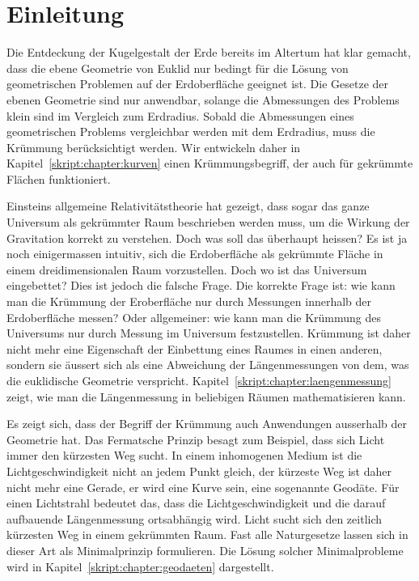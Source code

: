 %
%
%
\chapter*{Einleitung\label{chapter:einleitung}}
\rhead{}
Die Entdeckung der Kugelgestalt der Erde bereits im Altertum hat
klar gemacht, dass die ebene Geometrie von Euklid nur bedingt für
die Lösung von geometrischen Problemen auf der Erdoberfläche geeignet
ist.
Die Gesetze der ebenen Geometrie sind nur anwendbar, solange 
die Abmessungen des Problems klein sind im Vergleich zum Erdradius.
Sobald die Abmessungen eines geometrischen Problems vergleichbar werden
mit dem Erdradius, muss die Krümmung berücksichtigt werden.
Wir entwickeln daher in Kapitel~\ref{skript:chapter:kurven}
einen Krümmungsbegriff, der auch für gekrümmte Flächen funktioniert.

Einsteins allgemeine Relativitätstheorie hat gezeigt, dass sogar das
ganze Universum als gekrümmter Raum beschrieben werden muss, um die 
Wirkung der Gravitation korrekt zu verstehen.
Doch was soll das überhaupt heissen?
Es ist ja noch einigermassen intuitiv, sich die Erdoberfläche
als gekrümmte Fläche in einem dreidimensionalen Raum vorzustellen.
Doch wo ist das Universum eingebettet?
Dies ist jedoch die falsche Frage.
Die korrekte Frage ist: wie kann man die Krümmung der Eroberfläche
nur durch Messungen innerhalb der Erdoberfläche messen?
Oder allgemeiner: wie kann man die Krümmung des Universums nur durch
Messung im Universum festzustellen.
Krümmung ist daher nicht mehr eine Eigenschaft der Einbettung eines
Raumes in einen anderen, sondern sie äussert sich als eine Abweichung
der Längenmessungen von dem, was die euklidische Geometrie verspricht.
Kapitel~\ref{skript:chapter:laengenmessung} zeigt, wie man die Längenmessung
in beliebigen Räumen mathematisieren kann.

Es zeigt sich, dass der Begriff der Krümmung auch Anwendungen ausserhalb
der Geometrie hat.
Das Fermatsche Prinzip besagt zum Beispiel, dass sich Licht immer
den kürzesten Weg sucht.
In einem inhomogenen Medium ist die Lichtgeschwindigkeit nicht
an jedem Punkt gleich, der kürzeste Weg ist daher nicht mehr eine
Gerade, er wird eine Kurve sein, eine sogenannte Geodäte.
Für einen Lichtstrahl bedeutet das, dass die Lichtgeschwindigkeit und
die darauf aufbauende Längenmessung ortsabhängig wird.
Licht sucht sich den zeitlich kürzesten Weg in einem gekrümmten Raum.
Fast alle Naturgesetze lassen sich in dieser Art als Minimalprinzip
formulieren.
Die Lösung solcher Minimalprobleme wird in
Kapitel~\ref{skript:chapter:geodaeten} dargestellt.

